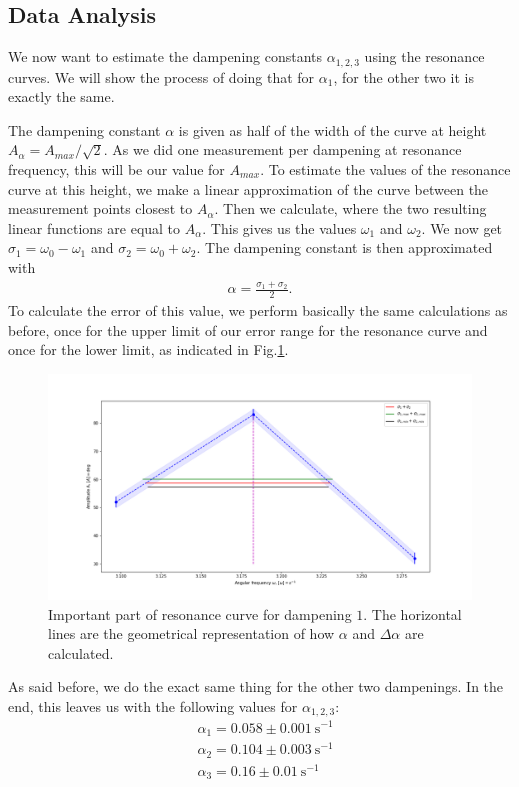 \subsection{Data Analysis}

We now want to estimate the dampening constants $\alpha_{1, 2, 3}$ using the resonance curves.
We will show the process of doing that for $\alpha_1$, for the other two it is exactly the same.

The dampening constant $\alpha$ is given as half of the width of the curve at height $A_{\alpha} = A_{max}/\sqrt{2}$.
As we did one measurement per dampening at resonance frequency, this will be our value for $A_{max}$.
To estimate the values of the resonance curve at this height, we make a linear approximation of the curve between the measurement points closest to $A_{\alpha}$.
Then we calculate, where the two resulting linear functions are equal to $A_{\alpha}$.
This gives us the values $\omega_1$ and $\omega_2$.
We now get $\sigma_1 = \omega_0 - \omega_1$ and $\sigma_2 = \omega_0 + \omega_2$.
The dampening constant is then approximated with 
\begin{align*}
	\alpha = \frac{\sigma_1 + \sigma_2}{2}.
\end{align*}
To calculate the error of this value, we perform basically the same calculations as before, once for the upper limit of our error range for the resonance curve and once for the lower limit, as indicated in Fig.\ref{fig::res_calc}.
\begin{figure} [ht]
	\centering
	\includegraphics[width=500pt]{python/res_calc.PNG}
	\caption{Important part of resonance curve for dampening $1$. The horizontal lines are the geometrical representation of how $\alpha$ and $\Delta \alpha$ are calculated.}
	\label{fig::res_calc}
\end{figure}

As said before, we do the exact same thing for the other two dampenings.
In the end, this leaves us with the following values for $\alpha_{1, 2, 3}$:
\begin{align*}
	&\alpha_1 = 0.058 \pm \SI{0.001}{\second^{-1}}\\
	&\alpha_2 = 0.104 \pm \SI{0.003}{\second^{-1}}\\
	&\alpha_3 = 0.16 \pm \SI{0.01}{\second^{-1}}
\end{align*}
